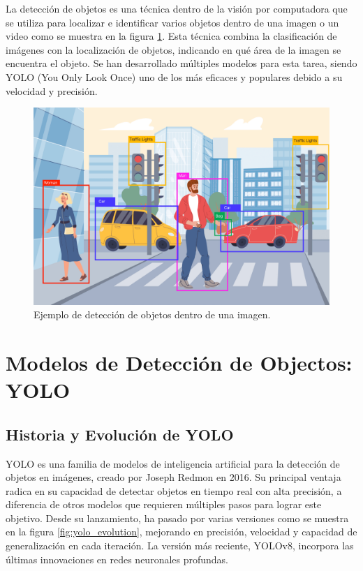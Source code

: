 La detección de objetos es una técnica dentro de la visión por computadora que se utiliza para localizar e identificar varios objetos dentro de una imagen o un video como se muestra en la figura \ref{fig:object_detection}. Esta técnica combina la clasificación de imágenes con la localización de objetos, indicando en qué área de la imagen se encuentra el objeto. Se han desarrollado múltiples modelos para esta tarea, siendo YOLO (You Only Look Once) uno de los más eficaces y populares debido a su velocidad y precisión.

\begin{figure}[!ht]
  \centering
  \includegraphics[width=.49\linewidth]{images/object_detection.png}
  \caption{Ejemplo de detección de objetos dentro de una imagen.}
  \label{fig:object_detection}
\end{figure}

\section{Modelos de Detección de Objectos: YOLO}

\subsection{Historia y Evolución de YOLO}

YOLO es una familia de modelos de inteligencia artificial para la detección de objetos en imágenes, creado por Joseph Redmon en 2016. Su principal ventaja radica en su capacidad de detectar objetos en tiempo real con alta precisión, a diferencia de otros modelos que requieren múltiples pasos para lograr este objetivo. Desde su lanzamiento, ha pasado por varias versiones como se muestra en la figura \ref{fig:yolo_evolution}, mejorando en precisión, velocidad y capacidad de generalización en cada iteración. La versión más reciente, YOLOv8, incorpora las últimas innovaciones en redes neuronales profundas.


